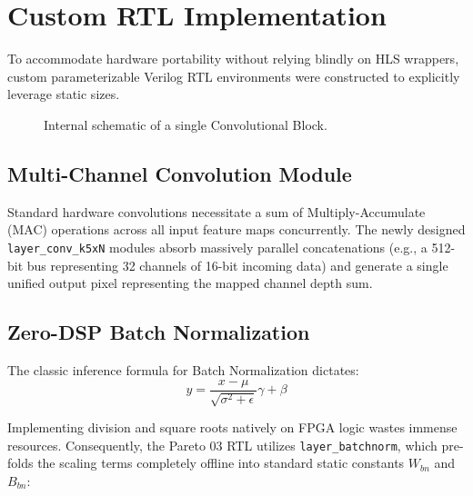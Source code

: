 \documentclass[11pt,a4paper,twocolumn]{article}
\begin{document}
\section{Custom RTL Implementation}

To accommodate hardware portability without relying blindly on HLS wrappers, custom parameterizable Verilog RTL environments were constructed to explicitly leverage static sizes.

\begin{figure}[H]
\centering
{}
\caption{Internal schematic of a single Convolutional Block.}
\label{fig:block_rtl}
\end{figure}

\subsection{Multi-Channel Convolution Module}
Standard hardware convolutions necessitate a sum of Multiply-Accumulate (MAC) operations across all input feature maps concurrently. The newly designed \texttt{layer\_conv\_k5xN} modules absorb massively parallel concatenations (e.g., a 512-bit bus representing 32 channels of 16-bit incoming data) and generate a single unified output pixel representing the mapped channel depth sum. 

\subsection{Zero-DSP Batch Normalization}
The classic inference formula for Batch Normalization dictates:
\begin{equation}
    y = \frac{x - \mu}{\sqrt{\sigma^2 + \epsilon}} \gamma + \beta
\end{equation}

Implementing division and square roots natively on FPGA logic wastes immense resources. Consequently, the Pareto 03 RTL utilizes \texttt{layer\_batchnorm}, which pre-folds the scaling terms completely offline into standard static constants $W_{bn}$ and $B_{bn}$:
\end{document}
